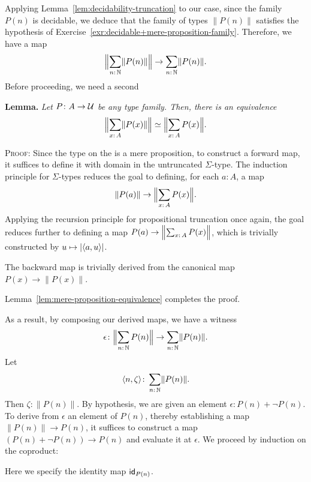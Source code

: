 \begin{solution}
    Applying Lemma~\ref{lem:decidability-truncation} to our case, since the family $P(n)$ is decidable, we deduce that the family of types $\lVert P(n)\rVert$ satisfies the hypothesis of Exercise~\ref{exr:decidable+mere-proposition-family}. Therefore, we have a map
    \[
        \Bigl\lVert
            \sum_{n\colon\N}\lVert P(n)\rVert
        \Bigr\rVert
        \to\sum_{n\colon\N}\lVert P(n)\rVert.
    \]
    Before proceeding, we need a second

    \textbf{Lemma.} {\itshape Let $P\colon A\to\univ$ be any type family. Then, there is an equivalence
    \[
        \Bigl\lVert
            \sum_{x\colon A}\lVert P(x)\rVert
        \Bigr\rVert
        \simeq
        \Bigl\lVert
            \sum_{x\colon A}P(x)
        \Bigr\rVert.
    \]}

    \textsc{Proof:} Since the type on the \lhs is a mere proposition, to construct a forward map, it suffices to define it with domain in the untruncated $\Sigma$-type. The induction principle for $\Sigma$-types reduces the goal to defining, for each $a\colon A$, a map
    \[
        \lVert P(a)\rVert\to\Bigl\lVert\sum_{x\colon A}P(x)\Bigr\rVert.
    \]
    Applying the recursion principle for propositional truncation once again, the goal reduces further to defining a map $P(a)\to\Bigl\lVert\sum_{x\colon A}P(x)\Bigr\rVert$, which is trivially constructed by $u\mapsto\lvert\langle a,u\rangle\rvert$.
    
    The backward map is trivially derived from the canonical map $P(x)\to\lVert P(x)\rVert$.
    
    Lemma~\ref{lem:mere-proposition-equivalence} completes the proof. \localqed

    \medskip
    As a result, by composing our derived maps, we have a witness
    \[
        \epsilon\colon\Bigl\lVert
            \sum_{n\colon\N}P(n)
        \Bigr\rVert
        \to\sum_{n\colon\N}\lVert P(n)\rVert.
    \]
    Let
    \[
        \dep{n,\zeta}\colon\sum_{n\colon\N}\lVert P(n)\rVert.
    \]
    Then $\zeta\colon\lVert P(n)\rVert$. By hypothesis, we are given an element $\epsilon\colon P(n)+\neg P(n)$. To derive from $\epsilon$ an element of $P(n)$, thereby establishing a map $\lVert P(n)\rVert\to P(n)$, it suffices to construct a map $(P(n)+\neg P(n))\to P(n)$ and evaluate it at $\epsilon$. We proceed by induction on the coproduct:
    
    \begin{description}[font=\normalfont\scshape]
        \item[Left branch:] Here we specify the identity map $\mathsf{id}_{P(n)}$.
    

\end{description}
\end{solution}
